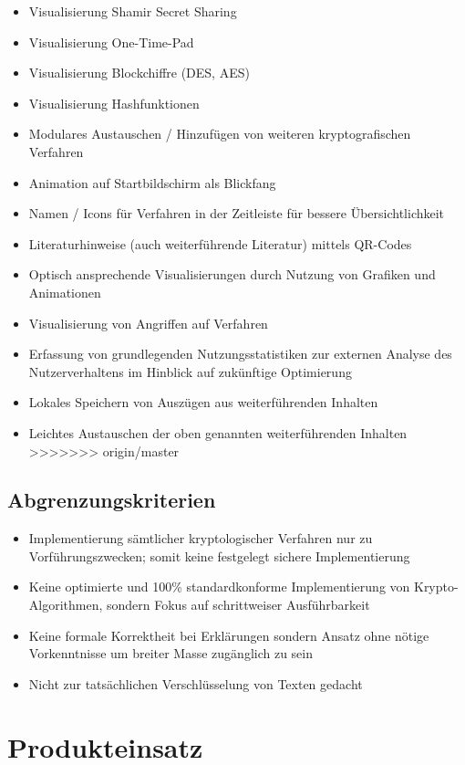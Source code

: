 \documentclass{article}
\begin{document}
\begin{itemize}
    \item Visualisierung Shamir Secret Sharing
    \item Visualisierung One-Time-Pad
    \item Visualisierung Blockchiffre (DES, AES)
    \item Visualisierung Hashfunktionen
    \item Modulares Austauschen / Hinzufügen von weiteren kryptografischen Verfahren
    \item Animation auf Startbildschirm als Blickfang
    \item Namen / Icons für Verfahren in der Zeitleiste für bessere Übersichtlichkeit
    \item Literaturhinweise (auch weiterführende Literatur) mittels QR-Codes
    \item Optisch ansprechende Visualisierungen durch Nutzung von Grafiken und Animationen
    \item Visualisierung von Angriffen auf Verfahren
    \item Erfassung von grundlegenden Nutzungsstatistiken zur externen Analyse des Nutzerverhaltens im Hinblick auf zukünftige Optimierung
    \item Lokales Speichern von Auszügen aus weiterführenden Inhalten
    \item Leichtes Austauschen der oben genannten weiterführenden Inhalten
>>>>>>> origin/master
\end{itemize}

\subsection{Abgrenzungskriterien}
\begin{itemize}
	\item Implementierung sämtlicher kryptologischer Verfahren nur zu Vorführungszwecken; somit keine festgelegt sichere Implementierung
    \item Keine optimierte und 100\% standardkonforme Implementierung von Krypto-Algorithmen,
        sondern Fokus auf schrittweiser Ausführbarkeit
    \item Keine formale Korrektheit bei Erklärungen sondern Ansatz ohne nötige Vorkenntnisse
        um breiter Masse zugänglich zu sein
    \item Nicht zur tatsächlichen Verschlüsselung von Texten gedacht
\end{itemize}

\section{Produkteinsatz}
\end{document}
